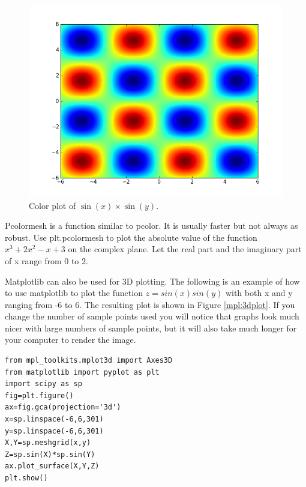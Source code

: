 \begin{figure}
\includegraphics[width=\textwidth]{pcolor.png}
\caption{Color plot of $\sin\left(x\right)\times\sin\left(y\right)$.}
\label{mpl:pcolor}
\end{figure}

\begin{problem}
Pcolormesh is a function similar to pcolor. It is usually faster but not always as robust.
Use plt.pcolormesh to plot the absolute value of the function $x^3 +2x^2 -x +3$ on the complex plane.
Let the real part and the imaginary part of x range from 0 to 2.
\end{problem}

Matplotlib can also be used for 3D plotting.
The following is an example of how to use matplotlib to plot the function $z=sin(x)sin(y)$ with both x and y ranging from -6 to 6.
The resulting plot is shown in Figure \ref{mpl:3dplot}.
If you change the number of sample points used you will notice that graphs look much nicer with large numbers of sample points, but it will also take much longer for your computer to render the image.

\begin{lstlisting}
from mpl_toolkits.mplot3d import Axes3D
from matplotlib import pyplot as plt
import scipy as sp
fig=plt.figure()
ax=fig.gca(projection='3d')
x=sp.linspace(-6,6,301)
y=sp.linspace(-6,6,301)
X,Y=sp.meshgrid(x,y)
Z=sp.sin(X)*sp.sin(Y)
ax.plot_surface(X,Y,Z)
plt.show()
\end{lstlisting}

